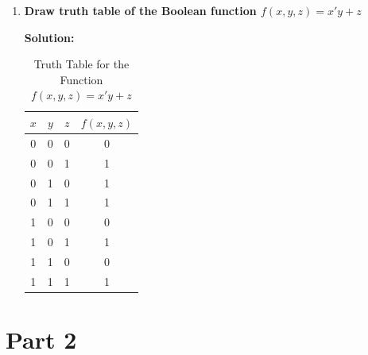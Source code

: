 \documentclass{article}
\begin{document}
\begin{enumerate}[label=\textbf{\arabic*.}]
\begin{enumerate}[label=\textbf{\alph*.}]
\begin{enumerate}[label=\textbf{\roman*.}]
        \end{enumerate}

   

    \end{enumerate}

    \newpage

    \item \textbf{Draw truth table of the Boolean function \(f(x,y,z) = x'y + z\)} \newline
    
    \textbf{Solution:} \newline

    \renewcommand{\arraystretch}{2} %

    \begin{table}[h]
        \centering
        \captionsetup{belowskip=10pt} %
        \caption{Truth Table for the Function \(f(x,y,z) = x'y + z\)} 
        
        \label{tab:my-table}
        \begin{tabular}{cccc} %
            \toprule
            \multicolumn{1}{c}{\(x\)} & 
            \multicolumn{1}{c}{\(y\)} & 
            \multicolumn{1}{c}{\(z\)} & 
            \multicolumn{1}{c}{\(f(x,y,z)\)} \\ 
            \midrule
            0 & 0 & 0 & 0 \\ \hline
            0 & 0 & 1 & 1 \\ \hline
            0 & 1 & 0 & 1 \\ \hline
            0 & 1 & 1 & 1 \\ \hline
            1 & 0 & 0 & 0 \\ \hline
            1 & 0 & 1 & 1 \\ \hline
            1 & 1 & 0 & 0 \\ \hline
            1 & 1 & 1 & 1 \\ \hline
            \bottomrule
        \end{tabular}
    \end{table}




\end{enumerate}

\newpage

\section*{Part 2}
\end{document}
